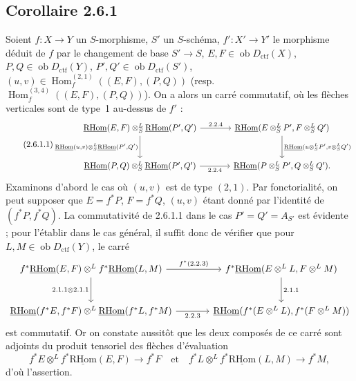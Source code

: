 \documentclass[11pt]{article}
\DeclareMathOperator{\Hom}{Hom}
\newcommand{\ob}{\operatorname{ob}}
\providecommand{\RHom}{\mathrm{RHom}}
\providecommand{\uRHom}{\underline{\RHom}}
\providecommand{\ctf}{\mathrm{ctf}}
\providecommand{\RHom}{\mathrm{RHom}}
\providecommand{\Hom}{\operatorname{Hom}}
\providecommand{\ob}{\operatorname{ob}}
\providecommand{\RHom}{\mathrm R\mathcal{H}om}
\providecommand{\RHom}{\mathrm{RHom}}
\providecommand{\Hom}{\operatorname{Hom}}
\begin{document}
\subsection*{Corollaire 2.6.1}
Soient $f:X\to Y$ un $S$-morphisme, $S'$ un $S$-schéma, $f':X'\to Y'$ le morphisme déduit de $f$ par le changement de base $S'\to S$, $E,F\in\ob D_{\ctf}(X)$, $P,Q\in\ob D_{\ctf}(Y)$, $P',Q'\in\ob D_{\ctf}(S')$, $(u,v)\in\Hom_f^{(2,1)}((E,F),(P,Q))$ (resp. $\Hom_f^{(3,4)}((E,F),(P,Q))$). On a alors un carré commutatif, où les flèches verticales sont de type~1 au-dessus de $f'$ :
\begin{equation}\tag{2.6.1.1}
\begin{tikzcd}[column sep=large,row sep=large]
\uRHom(E,F)\otimes^L_S\uRHom(P',Q') \arrow[r,"2.2.4"] \arrow[d,"{\uRHom(u,v)\otimes^L_S\uRHom(P',Q')}"'] & \uRHom(E\otimes^L_SP',F\otimes^L_SQ') \arrow[d,"{\uRHom(u\otimes^L_SP',v\otimes^L_SQ')}"]\\
\uRHom(P,Q)\otimes^L_S\uRHom(P',Q') \arrow[r,"2.2.4"'] & \uRHom(P\otimes^L_SP',Q\otimes^L_SQ').
\end{tikzcd}
\end{equation}
Examinons d'abord le cas où $(u,v)$ est de type $(2,1)$. Par fonctorialité, on peut supposer que $E=f^{*}P$, $F=f^{*}Q$, $(u,v)$ étant donné par l'identité de $(f^{*}P,f^{*}Q)$. La commutativité de 2.6.1.1 dans le cas $P'=Q'=A_{S'}$ est évidente ; pour l'établir dans le cas général, il suffit donc de vérifier que pour $L,M\in\ob D_{\ctf}(Y)$, le carré
\[
\begin{tikzcd}[column sep=large,row sep=large]
f^{*}\uRHom(E,F)\otimes^L f^{*}\uRHom(L,M) \arrow[r,"{f^*(2.2.3)}"] \arrow[d,"{2.1.1\otimes 2.1.1}"'] & f^{*}\uRHom(E\otimes^LL,F\otimes^LM) \arrow[d,"2.1.1"]\\
\uRHom(f^{*}E,f^{*}F)\otimes^L\uRHom(f^{*}L,f^{*}M) \arrow[r,"2.2.3"'] & \uRHom(f^{*}(E\otimes^LL),f^{*}(F\otimes^LM))
\end{tikzcd}
\]
est commutatif. Or on constate aussitôt que les deux composés de ce carré sont adjoints du produit tensoriel des flèches d'évaluation
\[
f^{*}E\otimes^L f^{*}\uRHom(E,F)\longrightarrow f^{*}F
\quad\text{et}\quad
f^{*}L\otimes^L f^{*}\uRHom(L,M)\longrightarrow f^{*}M,
\]
d'où l'assertion.
\end{document}
